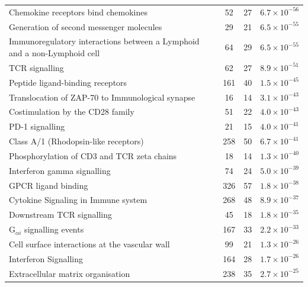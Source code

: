 \begin{table}[!hp]
{\begin{tabular}{lccc}
  Chemokine receptors bind chemokines &  52 &  27 & $6.7 \times 10^{-56}$ \\
  \rowcolor{Cluster_Orange!30} 
  Generation of second messenger molecules &  29 &  21 & $6.5 \times 10^{-55}$ \\
  \rowcolor{Cluster_Orange!20} 
  Immunoregulatory interactions between a Lymphoid and a non-Lymphoid cell &  64 &  29 & $6.5 \times 10^{-55}$ \\
  \rowcolor{Cluster_Orange!30} 
  TCR signalling &  62 &  27 & $8.9 \times 10^{-51}$ \\
  \rowcolor{Cluster_Orange!20} 
  Peptide ligand-binding receptors & 161 &  40 & $1.5 \times 10^{-45}$ \\
  \rowcolor{Cluster_Orange!30} 
  Translocation of ZAP-70 to Immunological synapse &  16 &  14 & $3.1 \times 10^{-43}$ \\
  \rowcolor{Cluster_Orange!20} 
  Costimulation by the CD28 family &  51 &  22 & $4.0 \times 10^{-43}$ \\
  \rowcolor{Cluster_Orange!30} 
  PD-1 signalling &  21 &  15 & $4.0 \times 10^{-41}$ \\
  \rowcolor{Cluster_Orange!20} 
  Class A/1 (Rhodopsin-like receptors) & 258 &  50 & $6.7 \times 10^{-41}$ \\
  \rowcolor{Cluster_Orange!30} 
  Phosphorylation of CD3 and TCR zeta chains &  18 &  14 & $1.3 \times 10^{-40}$ \\
  \rowcolor{Cluster_Orange!20} 
  Interferon gamma signalling &  74 &  24 & $5.0 \times 10^{-39}$ \\
  \rowcolor{Cluster_Orange!30} 
  GPCR ligand binding & 326 &  57 & $1.8 \times 10^{-38}$ \\
  \rowcolor{Cluster_Orange!20} 
  Cytokine Signaling in Immune system & 268 &  48 & $8.9 \times 10^{-37}$ \\
  \rowcolor{Cluster_Orange!30} 
  Downstream TCR signalling &  45 &  18 & $1.8 \times 10^{-35}$ \\
  \rowcolor{Cluster_Orange!20} 
  G$_{\alpha i}$ signalling events & 167 &  33 & $2.2 \times 10^{-33}$ \\
  \rowcolor{Cluster_Orange!30} 
  Cell surface interactions at the vascular wall &  99 &  21 & $1.3 \times 10^{-26}$ \\
  \rowcolor{Cluster_Orange!20} 
  Interferon Signalling & 164 &  28 & $1.7 \times 10^{-26}$ \\
  \rowcolor{Cluster_Orange!30} 
  Extracellular matrix organisation & 238 &  35 & $2.7 \times 10^{-25}$ \\

\end{tabular}}
\end{table}
